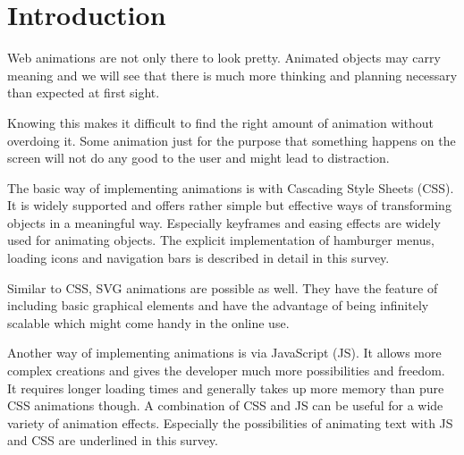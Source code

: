 %
%
% 
% 
% 


\chapter{Introduction}

\label{chap:Intro}

Web animations are not only there to look pretty. Animated objects may carry meaning and we will see that there is much more thinking and planning necessary than expected at first sight. 

Knowing this makes it difficult to find the right amount of animation without overdoing it. Some animation just for the purpose that something happens on the screen will not do any good to the user and might lead to distraction. 

The basic way of implementing animations is with Cascading Style Sheets (CSS). It is widely supported and offers rather simple but effective ways of transforming objects in a meaningful way. Especially keyframes and easing effects are widely used for animating objects. 
The explicit implementation of hamburger menus, loading icons and navigation bars is described in detail in this survey. 

Similar to CSS, SVG animations are possible as well. They have the feature of including basic graphical elements and have the advantage of being infinitely scalable which might come handy in the online use. 

Another way of implementing animations is via JavaScript (JS). It allows more complex creations and gives the developer much more possibilities and freedom. It requires longer loading times and generally takes up more memory than pure CSS animations though. A combination of CSS and JS can be useful for a wide variety of animation effects. 
Especially the possibilities of animating text with JS and CSS are underlined in this survey. 
